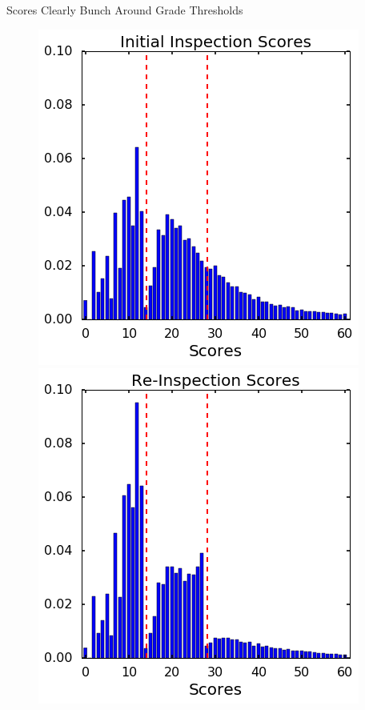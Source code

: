 \documentclass[handout]{beamer}
\begin{document}
\begin{frame}{Scores Clearly Bunch Around Grade Thresholds}

\begin{figure}
    \centering
    \includegraphics[scale = 0.4]{../../Figures/init_score.png}
    \includegraphics[scale = 0.4]{../../Figures/re_score.png}
\end{figure}
\end{frame}
\end{document}
